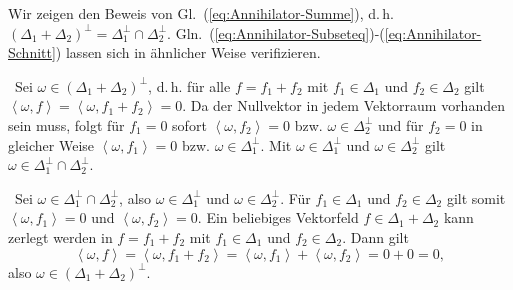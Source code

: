 \begin{loesung}Wir zeigen den Beweis von Gl.~(\ref{eq:Annihilator-Summe}),
d.\,h. $(\Delta_{1}+\Delta_{2})^{\perp}=\Delta_{1}^{\perp}\cap\Delta_{2}^{\perp}$.
Gln.~(\ref{eq:Annihilator-Subseteq})-(\ref{eq:Annihilator-Schnitt})
lassen sich in ähnlicher Weise verifizieren.

\hinreichend\ Sei $\omega\in(\Delta_{1}+\Delta_{2})^{\perp}$, d.\,h.
für alle $f=f_{1}+f_{2}$ mit $f_{1}\in\Delta_{1}$ und $f_{2}\in\Delta_{2}$
gilt $\left\langle \omega,f\right\rangle =\left\langle \omega,f_{1}+f_{2}\right\rangle =0$.
Da der Nullvektor in jedem Vektorraum vorhanden sein muss, folgt für
$f_{1}=0$ sofort $\left\langle \omega,f_{2}\right\rangle =0$ bzw.
$\omega\in\Delta_{2}^{\perp}$ und für $f_{2}=0$ in gleicher Weise
$\left\langle \omega,f_{1}\right\rangle =0$ bzw. $\omega\in\Delta_{1}^{\perp}$.
Mit $\omega\in\Delta_{1}^{\perp}$ und $\omega\in\Delta_{2}^{\perp}$
gilt $\omega\in\Delta_{1}^{\perp}\cap\Delta_{2}^{\perp}$.

\notwendig\ Sei $\omega\in\Delta_{1}^{\perp}\cap\Delta_{2}^{\perp}$,
also $\omega\in\Delta_{1}^{\perp}$ und $\omega\in\Delta_{2}^{\perp}$.
Für $f_{1}\in\Delta_{1}$ und $f_{2}\in\Delta_{2}$ gilt somit $\left\langle \omega,f_{1}\right\rangle =\text{0}$
und $\left\langle \omega,f_{2}\right\rangle =\text{0}$. Ein beliebiges
Vektorfeld $f\in\Delta_{1}+\Delta_{2}$ kann zerlegt werden in $f=f_{1}+f_{2}$
mit $f_{1}\in\Delta_{1}$ und $f_{2}\in\Delta_{2}$. Dann gilt 
\[
\left\langle \omega,f\right\rangle =\left\langle \omega,f_{1}+f_{2}\right\rangle =\left\langle \omega,f_{1}\right\rangle +\left\langle \omega,f_{2}\right\rangle =0+0=0,
\]
also $\omega\in(\Delta_{1}+\Delta_{2})^{\perp}$.

\end{loesung}

